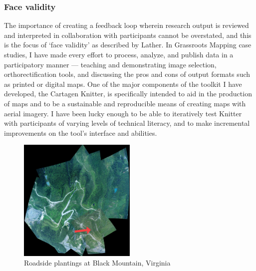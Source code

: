 \documentclass[11pt]{report}
\begin{document}
\subsubsection{Face validity}

The importance of creating a feedback loop wherein research output is reviewed and interpreted in collaboration with participants cannot be overstated, and this is the focus of `face validity' as described by Lather. In Grassroots Mapping case studies, I have made every effort to process, analyze, and publish data in a participatory manner --- teaching and demonstrating image selection, orthorectification tools, and discussing the pros and cons of output formats such as printed or digital maps. One of the major components of the toolkit I have developed, the Cartagen Knitter, is specifically intended to aid in the production of maps and to be a sustainable and reproducible means of creating maps with aerial imagery. I have been lucky enough to be able to iteratively test Knitter with participants of varying levels of technical literacy, and to make incremental improvements on the tool's interface and abilities.  

\begin{figure}
  \begin{flushright}
	\includegraphics[width=0.5\textwidth]{images/black-mountain.jpg}
	\caption{Roadside plantings at Black Mountain, Virginia}
  \end{flushright}
\end{figure}
\end{document}
